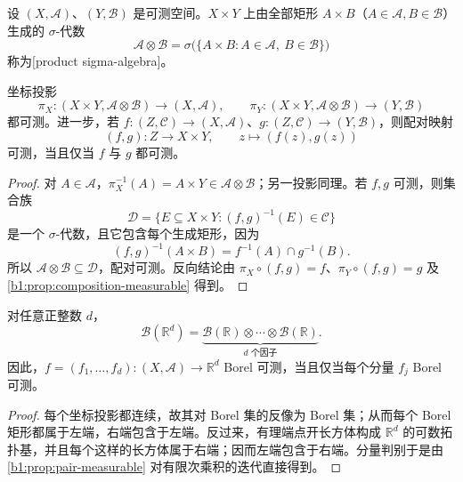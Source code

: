 \begin{definition}
\label{b1:def:product-sigma}
设 \((X,\mathcal A)\)、\((Y,\mathcal B)\) 是可测空间。\(X\times Y\) 上由全部矩形 \(A\times B\)（\(A\in\mathcal A,B\in\mathcal B\)）生成的 \(\sigma\)-代数
\[
\mathcal A\otimes\mathcal B
=\sigma\bigl(\{A\times B:A\in\mathcal A,\ B\in\mathcal B\}\bigr)
\]
称为[product sigma-algebra]。
\end{definition}

\begin{proposition}
\label{b1:prop:pair-measurable}
坐标投影
\[
\pi_X:(X\times Y,\mathcal A\otimes\mathcal B)\to(X,\mathcal A),
\qquad
\pi_Y:(X\times Y,\mathcal A\otimes\mathcal B)\to(Y,\mathcal B)
\]
都可测。进一步，若 \(f:(Z,\mathcal C)\to(X,\mathcal A)\)、\(g:(Z,\mathcal C)\to(Y,\mathcal B)\)，则配对映射
\[
(f,g):Z\to X\times Y,
\qquad
z\mapsto(f(z),g(z))
\]
可测，当且仅当 \(f\) 与 \(g\) 都可测。
\end{proposition}
\begin{proof}
对 \(A\in\mathcal A\)，\(\pi_X^{-1}(A)=A\times Y\in\mathcal A\otimes\mathcal B\)；另一投影同理。若 \(f,g\) 可测，则集合族
\[
\mathcal D=\{E\subseteq X\times Y:(f,g)^{-1}(E)\in\mathcal C\}
\]
是一个 \(\sigma\)-代数，且它包含每个生成矩形，因为
\[
(f,g)^{-1}(A\times B)=f^{-1}(A)\cap g^{-1}(B).
\]
所以 \(\mathcal A\otimes\mathcal B\subseteq\mathcal D\)，配对可测。反向结论由 \(\pi_X\circ(f,g)=f\)、\(\pi_Y\circ(f,g)=g\) 及 \cref{b1:prop:composition-measurable} 得到。
\end{proof}

\begin{proposition}
\label{b1:prop:euclidean-product-borel}
对任意正整数 \(d\)，
\[
\mathcal B(\mathbb R^d)
=\underbrace{\mathcal B(\mathbb R)\otimes\cdots\otimes\mathcal B(\mathbb R)}_{d\text{ 个因子}}.
\]
因此，\(f=(f_1,\ldots,f_d):(X,\mathcal A)\to\mathbb R^d\) Borel 可测，当且仅当每个分量 \(f_j\) Borel 可测。
\end{proposition}
\begin{proof}
每个坐标投影都连续，故其对 Borel 集的反像为 Borel 集；从而每个 Borel 矩形都属于左端，右端包含于左端。反过来，有理端点开长方体构成 \(\mathbb R^d\) 的可数拓扑基，并且每个这样的长方体属于右端；因而左端包含于右端。分量判别于是由 \cref{b1:prop:pair-measurable} 对有限次乘积的迭代直接得到。
\end{proof}
